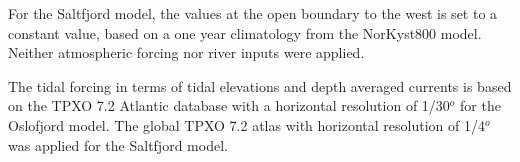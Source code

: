 For the Saltfjord model, the values at the open boundary to the west is set to a constant value, based on a one year climatology from the NorKyst800 model. Neither atmospheric forcing nor river inputs were applied.

The tidal forcing in terms of tidal elevations and depth averaged currents is based on the TPXO 7.2 Atlantic database with a horizontal resolution of 1/30$^o$ \cite[]{egbert02} for the Oslofjord model. The global TPXO 7.2 atlas with  horizontal resolution of 1/4$^o$ was applied for the Saltfjord model. 
